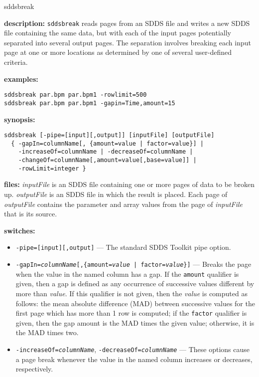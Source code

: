 \begin{sddsprog}{sddsbreak}
  \item \textbf{description:} \verb|sddsbreak| reads pages from an SDDS file and writes a new SDDS file containing the same data, but with each of the input pages potentially separated into several output pages. The separation involves breaking each input page at one or more locations as determined by one of several user-defined criteria.
  \item \textbf{examples:}
  \begin{verbatim}
sddsbreak par.bpm par.bpm1 -rowlimit=500
sddsbreak par.bpm par.bpm1 -gapin=Time,amount=15
  \end{verbatim}
  \item \textbf{synopsis:}
  \begin{verbatim}
sddsbreak [-pipe=[input][,output]] [inputFile] [outputFile]
  { -gapIn=columnName[, {amount=value | factor=value}] |
    -increaseOf=columnName | -decreaseOf=columnName |
    -changeOf=columnName[,amount=value[,base=value]] |
    -rowLimit=integer }
  \end{verbatim}
  \item \textbf{files:} \emph{inputFile} is an SDDS file containing one or more pages of data to be broken up. \emph{outputFile} is an SDDS file in which the result is placed. Each page of \emph{outputFile} contains the parameter and array values from the page of \emph{inputFile} that is its source.
  \item \textbf{switches:}
    \begin{itemize}
      \item {\tt -pipe=[input][,output]} --- The standard SDDS Toolkit pipe option.
      \item {\tt -gapIn=\emph{columnName}[,\{amount=\emph{value} | factor=\emph{value}\}]} --- Breaks the page when the value in the named column has a gap. If the \verb|amount| qualifier is given, then a gap is defined as any occurrence of successive values different by more than \emph{value}. If this qualifier is not given, then the \emph{value} is computed as follows: the mean absolute difference (MAD) between successive values for the first page which has more than 1 row is computed; if the {\tt factor} qualifier is given, then the gap amount is the MAD times the given value; otherwise, it is the MAD times two.
      \item {\tt -increaseOf=\emph{columnName}}, {\tt -decreaseOf=\emph{columnName}} --- These options cause a page break whenever the value in the named column increases or decreases, respectively.

\end{itemize}
\end{sddsprog}
